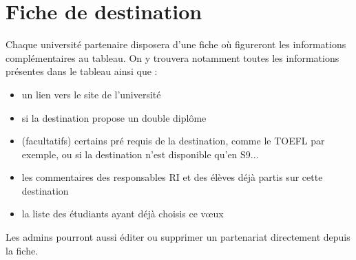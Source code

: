  \section{Fiche de destination}
 Chaque université partenaire disposera d'une fiche où figureront les informations complémentaires au tableau.
 On y trouvera notamment toutes les informations présentes dans le tableau ainsi que :
 \begin{itemize}
 	\item un lien vers le site de l'université
 	\item si la destination propose un double diplôme
 	\item (facultatifs) certains pré requis de la destination, comme le TOEFL par exemple, ou si la destination n'est disponible qu'en S9...
 	\item les commentaires des responsables RI et des élèves déjà partis sur cette destination
 	\item la liste des étudiants ayant déjà choisis ce vœux
 \end{itemize}
 

 
 Les admins pourront aussi éditer ou supprimer un partenariat directement depuis la fiche.
